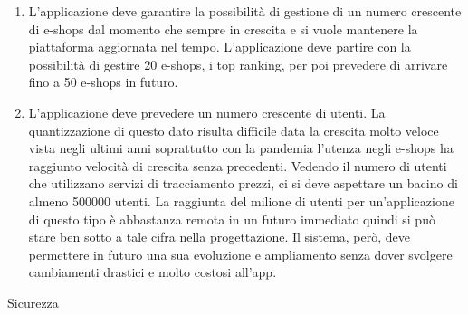 \documentclass{article}
\begin{document}
\begin{enumerate}
    \item L’applicazione deve garantire la possibilità di gestione di un numero crescente di e-shops dal momento che sempre in crescita e si
            vuole mantenere la piattaforma aggiornata nel tempo. L’applicazione deve partire con la possibilità di gestire 20 e-shops,
            i top ranking, per poi prevedere di arrivare fino a 50 e-shops in futuro.
    \item L’applicazione deve prevedere un numero crescente di utenti. La quantizzazione di questo dato risulta difficile data la crescita
            molto veloce vista negli ultimi anni soprattutto con la pandemia l’utenza negli e-shops ha raggiunto velocità di crescita senza
            precedenti. Vedendo il numero di utenti che utilizzano servizi di tracciamento prezzi, ci si deve aspettare un bacino di almeno
            500000 utenti. La raggiunta del milione di utenti per un’applicazione di questo tipo è abbastanza remota in un futuro immediato
            quindi si può stare ben sotto a tale cifra nella progettazione. Il sistema, però, deve permettere in futuro una sua evoluzione e
            ampliamento senza dover svolgere cambiamenti drastici e molto costosi all’app.
\end{enumerate}
Sicurezza
\end{document}

